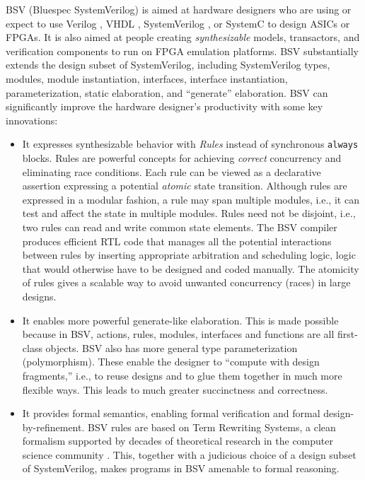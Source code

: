 \documentclass[twoside,letterpaper]{article}
\newcommand{\BSVFull}{Bluespec SystemVerilog}
\newcommand{\BSV}{BSV}
\newcommand{\SV}{SystemVerilog}
\begin{document}
\vspace*{3ex}

{\BSV} ({\BSVFull}) is aimed at hardware designers who are using or
expect to use Verilog {\cite{IEEEVerilog2005a}}, VHDL
{\cite{IEEEVHDL2002}}, {\SV} {\cite{IEEESystemVerilog2012a}}, or
SystemC {\cite{IEEESystemC2011a}} to design ASICs or FPGAs.  It is also
aimed at people creating \emph{synthesizable} models, transactors, and
verification components to run on FPGA emulation platforms.  {\BSV}
substantially extends the design subset of {\SV}, including {\SV}
types, modules, module instantiation, interfaces, interface
instantiation, parameterization, static elaboration, and ``generate''
elaboration.  {\BSV} can significantly improve the hardware designer's
productivity with some key innovations:
\begin{itemize}
\item
It expresses synthesizable behavior with \emph{Rules} instead of
synchronous \texttt{always} blocks.  Rules are powerful concepts for
achieving \emph{correct} concurrency and eliminating race conditions.
Each rule can be viewed as a declarative assertion expressing a
potential \emph{atomic} state transition.  Although rules are
expressed in a modular fashion, a rule may span multiple modules,
i.e., it can test and affect the state in multiple modules.  Rules
need not be disjoint, i.e., two rules can read and write common state
elements.  The {\BSV} compiler produces efficient RTL code that
manages all the potential interactions between rules by inserting
appropriate arbitration and scheduling logic, logic that would
otherwise have to be designed and coded manually.  The atomicity of
rules gives a scalable way to avoid unwanted concurrency (races) in
large designs.

\item
It enables more powerful generate-like elaboration.  This is made
possible because in BSV, actions, rules, modules, interfaces and
functions are all first-class objects.  {\BSV} also has more general
type parameterization (polymorphism).  These enable the designer to
``compute with design fragments,'' i.e., to reuse designs and to glue
them together in much more flexible ways.  This leads to much greater
succinctness and correctness.

\item
It provides formal semantics, enabling formal verification and formal
design-by-refinement.  {\BSV} rules are based on Term Rewriting
Systems, a clean formalism supported by decades of theoretical
research in the computer science community {\cite{Terese2003}}.  This,
together with a judicious choice of a design subset of {\SV}, makes
programs in {\BSV} amenable to formal reasoning.

\end{itemize}
\end{document}
